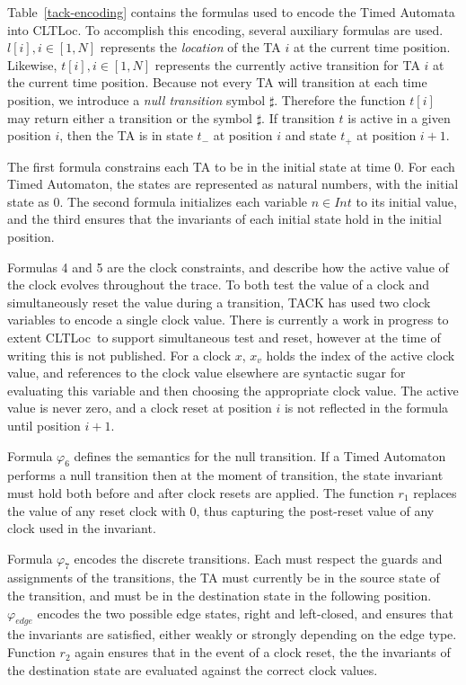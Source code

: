 \documentclass[a4paper,11pt]{report}
\theoremstyle{definition}
\newcommand{\cltloc}{CLTLoc}
\begin{document}
Table~\ref{tack-encoding} contains the formulas used to encode the Timed
Automata into CLTLoc. To accomplish this encoding, several auxiliary formulas
are used. \(l[i], i \in [1,N]\) represents the \emph{location} of the TA \(i\)
at the current time position. Likewise, \(t[i], i \in [1,N]\) represents the
currently active transition for TA \(i\) at the current time position. Because
not every TA will transition at each time position, we introduce a \emph{null
  transition} symbol \(\sharp\). Therefore the function \(t[i]\) may return
either a transition or the symbol \(\sharp\). If transition \(t\) is active in a
given position \(i\), then the TA is in state \(t_{-}\) at position \(i\) and
state \(t_{+}\) at position \(i+1\).

The first formula constrains each TA to be in the initial state at time 0. For
each Timed Automaton, the states are represented as natural numbers, with the
initial state as \(0\). The second formula initializes each variable
\(n \in Int\) to its initial value, and the third ensures that the invariants of
each initial state hold in the initial position.

Formulas 4 and 5 are the clock constraints, and describe how the active value of
the clock evolves throughout the trace. To both test the value of a clock and
simultaneously reset the value during a transition, TACK has used two clock
variables to encode a single clock value. There is currently a work in progress
to extent \cltloc\ to support simultaneous test and reset, however at the time
of writing this is not published. For a clock $x$, $x_{v}$ holds the index of
the active clock value, and references to the clock value elsewhere are
syntactic sugar for evaluating this variable and then choosing the appropriate
clock value. The active value is never zero, and a clock reset at position $i$
is not reflected in the formula until position $i{+}1$.

Formula $\varphi_{6}$ defines the semantics for the null transition. If a Timed
Automaton performs a null transition then at the moment of transition, the state
invariant must hold both before and after clock resets are applied. The function
$r_{1}$ replaces the value of any reset clock with $0$, thus capturing the
post-reset value of any clock used in the invariant.

Formula $\varphi_{7}$ encodes the discrete transitions. Each must respect the guards
and assignments of the transitions, the TA must currently be in the source state
of the transition, and must be in the destination state in the following
position. $\varphi_{edge}$ encodes the two possible edge states, right and
left-closed, and ensures that the invariants are satisfied, either weakly or
strongly depending on the edge type. Function $r_{2}$ again ensures that in the
event of a clock reset, the the invariants of the destination state are
evaluated against the correct clock values.
\end{document}
